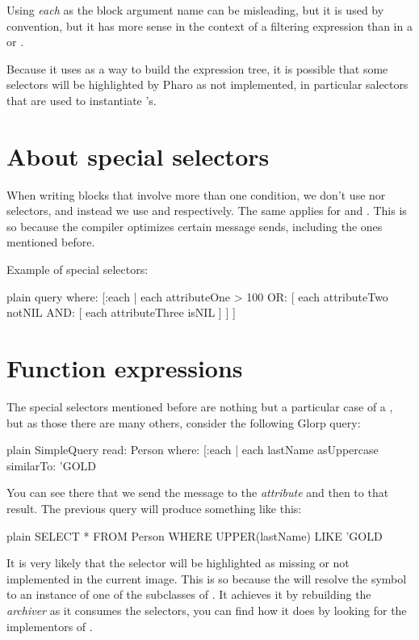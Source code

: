 \documentclass[10pt,twoside,english]{_support/latex/sbabook/sbabook}
\begin{document}
Using \textit{each} as the block argument name can be misleading, but it is used
by convention, but it has more sense in the context of a filtering expression
than in a  or .

Because it uses  as a way to build the expression tree,
it is possible that some selectors will be highlighted by Pharo as not
implemented, in particular salectors that are used to instantiate
's.
\section{About special selectors}
When writing blocks that involve more than one condition, we don't use
 nor  selectors, and instead we use  and 
respectively. The same applies for  and . This is so
because the compiler optimizes certain message sends, including the ones
mentioned before.

Example of special selectors:

\begin{displaycode}{plain}
query where: [:each |
 each attributeOne > 100 OR: [
	each attributeTwo notNIL AND: [
		each attributeThree isNIL ] ] ]
\end{displaycode}
\section{Function expressions}
The special selectors mentioned before are nothing but a particular case of a
, but as those there are many others, consider the
following Glorp query:

\begin{displaycode}{plain}
SimpleQuery read: Person where: [:each |
	each lastName asUppercase similarTo: 'GOLD%
\end{displaycode}

You can see there that we send the  message to the 
\textit{attribute} and then  to that result. The previous query will produce something like this:

\begin{displaycode}{plain}
SELECT * FROM Person WHERE UPPER(lastName) LIKE 'GOLD%
\end{displaycode}

It is very likely that the  selector will be highlighted
as missing or not implemented in the current image. This is so because
the  will resolve the symbol to an instance of one
of the subclasses of . It achieves it by rebuilding
the \textit{archiver} as it consumes the selectors, you can find how it does by
looking for the implementors of .
\end{document}
